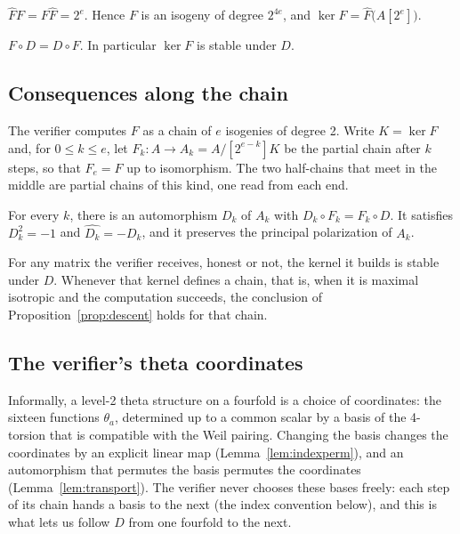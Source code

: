 \documentclass[version=preprint]{iacrcc}
\begin{document}
    \begin{lemma}
        \label{lem:kani}
        $\widehat{F} F = F \widehat{F} = 2^e$. Hence $F$ is an isogeny of degree
        $2^{4e}$, and $\ker F = \widehat{F}\bigl(A[2^e]\bigr)$.
    \end{lemma}


    \begin{proposition}
        \label{prop:commute}
        $F \circ D = D \circ F$. In particular $\ker F$ is stable under $D$.
    \end{proposition}


    \subsection{Consequences along the chain}
    \label{app:chain}

    The verifier computes $F$ as a chain of $e$ isogenies of degree 2. Write
    $K = \ker F$ and, for $0 \le k \le e$, let $F_k \colon A \to A_k =
    A / [2^{e-k}]K$ be the partial chain after $k$ steps, so that $F_e = F$ up
    to isomorphism. The two half-chains that meet in the middle are partial
    chains of this kind, one read from each end.

    \begin{proposition}
        \label{prop:descent}
        For every $k$, there is an automorphism $D_k$ of $A_k$ with
        $D_k \circ F_k = F_k \circ D$. It satisfies $D_k^2 = -1$ and
        $\widehat{D_k} = -D_k$, and it preserves the principal polarization of
        $A_k$.
    \end{proposition}


    \begin{proposition}
        \label{prop:forged}
        For any matrix the verifier receives, honest or not, the kernel it builds
        is stable under $D$. Whenever that kernel defines a chain, that is, when it
        is maximal isotropic and the computation succeeds, the conclusion of
        Proposition~\ref{prop:descent} holds for that chain.
    \end{proposition}


    \subsection{The verifier's theta coordinates}
    \label{app:coords}

    Informally, a level-2 theta structure on a fourfold is a choice of
    coordinates: the sixteen functions $\theta_a$, determined up to a common
    scalar by a basis of the 4-torsion that is compatible with the Weil pairing.
    Changing the basis changes the coordinates by an explicit linear map
    (Lemma~\ref{lem:indexperm}), and an automorphism that permutes the basis
    permutes the coordinates (Lemma~\ref{lem:transport}). The verifier never
    chooses these bases freely: each step of its chain hands a basis to the
    next (the index convention below), and this is what lets us follow $D$
    from one fourfold to the next.
\end{document}
